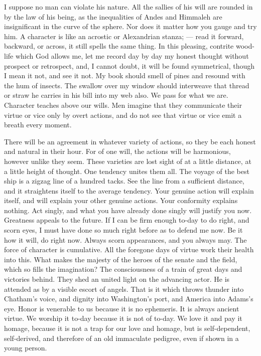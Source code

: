 \documentclass{article}
\begin{document}
I suppose no man can violate his nature. All the sallies of his will are
rounded in by the law of his being, as the inequalities of Andes and
Himmaleh are insignificant in the curve of the sphere. Nor does it matter
how you gauge and try him. A character is like an acrostic or Alexandrian
stanza; --- read it forward, backward, or across, it still spells the same
thing. In this pleasing, contrite wood-life which God allows me, let me
record day by day my honest thought without prospect or retrospect, and, I
cannot doubt, it will be found symmetrical, though I mean it not, and see it
not. My book should smell of pines and resound with the hum of insects. The
swallow over my window should interweave that thread or straw he carries in
his bill into my web also. We pass for what we are. Character teaches above
our wills. Men imagine that they communicate their virtue or vice only by
overt actions, and do not see that virtue or vice emit a breath every
moment.

There will be an agreement in whatever variety of actions, so they be each
honest and natural in their hour. For of one will, the actions will be
harmonious, however unlike they seem. These varieties are lost sight of at a
little distance, at a little height of thought. One tendency unites them
all. The voyage of the best ship is a zigzag line of a hundred tacks. See
the line from a sufficient distance, and it straightens itself to the
average tendency. Your genuine action will explain itself, and will explain
your other genuine actions. Your conformity explains nothing. Act singly,
and what you have already done singly will justify you now. Greatness
appeals to the future. If I can be firm enough to-day to do right, and scorn
eyes, I must have done so much right before as to defend me now. Be it how
it will, do right now. Always scorn appearances, and you always may. The
force of character is cumulative. All the foregone days of virtue work their
health into this. What makes the majesty of the heroes of the senate and the
field, which so fills the imagination? The consciousness of a train of great
days and victories behind. They shed an united light on the advancing actor.
He is attended as by a visible escort of angels. That is it which throws
thunder into Chatham's voice, and dignity into Washington's port, and
America into Adams's eye. Honor is venerable to us because it is no
ephemeris. It is always ancient virtue. We worship it to-day because it is
not of to-day. We love it and pay it homage, because it is not a trap for
our love and homage, but is self-dependent, self-derived, and therefore of
an old immaculate pedigree, even if shown in a young person.
\end{document}
